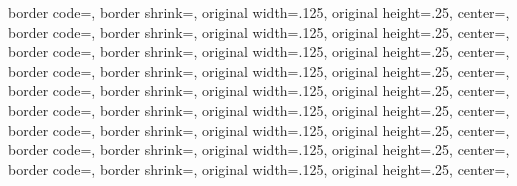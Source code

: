 {{	border code=\pgfsetlinewidth{.5pt}\pgfstroke,%
  }%
  {%
	border shrink=\pgfpageoptionborder,%
	original width=.125\pgfpageoptionheight,%
	original height=.25\pgfpageoptionwidth,%
	center=\pgfpoint{.75\pgfphysicalwidth}{.5\pgfphysicalheight},%
	border code=\pgfsetlinewidth{.5pt}\pgfstroke,%
  }%
  {%
	border shrink=\pgfpageoptionborder,%
	original width=.125\pgfpageoptionheight,%
	original height=.25\pgfpageoptionwidth,%
	center=\pgfpoint{.5\pgfphysicalwidth}{.5\pgfphysicalheight},%
	border code=\pgfsetlinewidth{.5pt}\pgfstroke,%
	}%
  {%
	border shrink=\pgfpageoptionborder,%
	original width=.125\pgfpageoptionheight,%
	original height=.25\pgfpageoptionwidth,%
	center=\pgfpoint{.25\pgfphysicalwidth}{.5\pgfphysicalheight},%
	border code=\pgfsetlinewidth{.5pt}\pgfstroke,%
  }%
  {%
	border shrink=\pgfpageoptionborder,%
	original width=.125\pgfpageoptionheight,%
	original height=.25\pgfpageoptionwidth,%
	center=\pgfpoint{0pt}{.5\pgfphysicalheight},%
	border code=\pgfsetlinewidth{.5pt}\pgfstroke,%
  }%
  {%
	border shrink=\pgfpageoptionborder,%
	original width=.125\pgfpageoptionheight,%
	original height=.25\pgfpageoptionwidth,%
	center=\pgfpoint{.75\pgfphysicalwidth}{.375\pgfphysicalheight},%
	border code=\pgfsetlinewidth{.5pt}\pgfstroke,%
  }%
  {%
	border shrink=\pgfpageoptionborder,%
	original width=.125\pgfpageoptionheight,%
	original height=.25\pgfpageoptionwidth,%
	center=\pgfpoint{.5\pgfphysicalwidth}{.375\pgfphysicalheight},%
	border code=\pgfsetlinewidth{.5pt}\pgfstroke,%
	}%
  {%
	border shrink=\pgfpageoptionborder,%
	original width=.125\pgfpageoptionheight,%
	original height=.25\pgfpageoptionwidth,%
	center=\pgfpoint{.25\pgfphysicalwidth}{.375\pgfphysicalheight},%
	border code=\pgfsetlinewidth{.5pt}\pgfstroke,%
  }%
  {%
	border shrink=\pgfpageoptionborder,%
	original width=.125\pgfpageoptionheight,%
	original height=.25\pgfpageoptionwidth,%
	center=\pgfpoint{0pt}{.375\pgfphysicalheight},%
	border code=\pgfsetlinewidth{.5pt}\pgfstroke,%
  }%
  {%
	border shrink=\pgfpageoptionborder,%
	original width=.125\pgfpageoptionheight,%
	original height=.25\pgfpageoptionwidth,%
	center=\pgfpoint{.75\pgfphysicalwidth}{.25\pgfphysicalheight},%
}}
